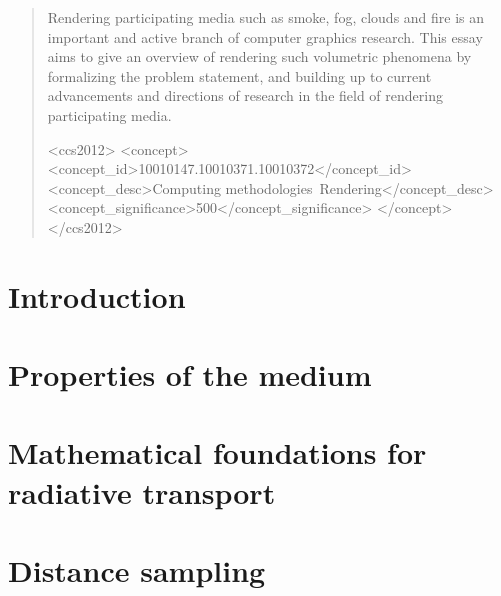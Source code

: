 \maketitle
\begin{abstract}
    Rendering participating media such as smoke, fog, clouds and fire is 
    an important and active branch of computer graphics research. 
    This essay aims to give an overview of rendering such 
    volumetric phenomena by formalizing the problem statement, and building
    up to current advancements and directions of research in the field of
    rendering participating media.
   
\begin{CCSXML}
<ccs2012>
   <concept>
       <concept_id>10010147.10010371.10010372</concept_id>
       <concept_desc>Computing methodologies~Rendering</concept_desc>
       <concept_significance>500</concept_significance>
       </concept>
 </ccs2012>
\end{CCSXML}


\printccsdesc   
\end{abstract}  
\section{Introduction}

\section{Properties of the medium}
\label{section:properties-of-the-volume}

\section{Mathematical foundations for radiative transport}
\label{section:mathematical-foundations}

\section{Distance sampling}
\label{section:distance-sampling}

